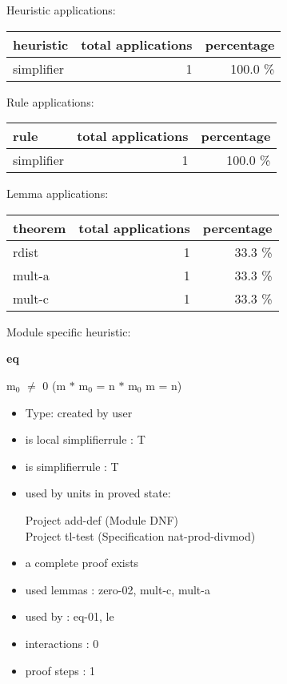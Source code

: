 \documentclass[a4paper]{article}
\begin{document}
\medskip


Heuristic applications:

\begin{supertabular}{l|r|r}
heuristic	& total applications & percentage \\ \hline
simplifier & 1 & 100.0 \% \\

\end{supertabular}

Rule applications:

\begin{supertabular}{l|r|r}
rule	        & total applications & percentage \\ \hline
simplifier & 1 & 100.0 \% \\

\end{supertabular}

Lemma applications:

\begin{supertabular}{l|r|r}
theorem	        & total applications & percentage \\ \hline
rdist & 1 & 33.3 \% \\
mult-a & 1 & 33.3 \% \\
mult-c & 1 & 33.3 \% \\

\end{supertabular}

Module specific heuristic:

\pagebreak

{\LARGE\bf eq}\label{lemma-eq}

\medskip

 \Fol $\mbox{m}_{0}$ $\neq$ 0 \Imp (m $*$ $\mbox{m}_{0}$ = n $*$ $\mbox{m}_{0}$ \Equiv m = n)

\begin{itemize}

\item Type: created by user

\item is local simplifierrule : T
\item is simplifierrule : T
\item used by units in proved state:

Project add-def (Module DNF) \\
Project tl-test (Specification nat-prod-divmod)
\item       a complete proof exists
\item       used lemmas  : zero-02, mult-c, mult-a
\item       used by      : eq-01, le
\item       interactions : 0
\item       proof steps  : 1
\end{itemize}
\end{document}
